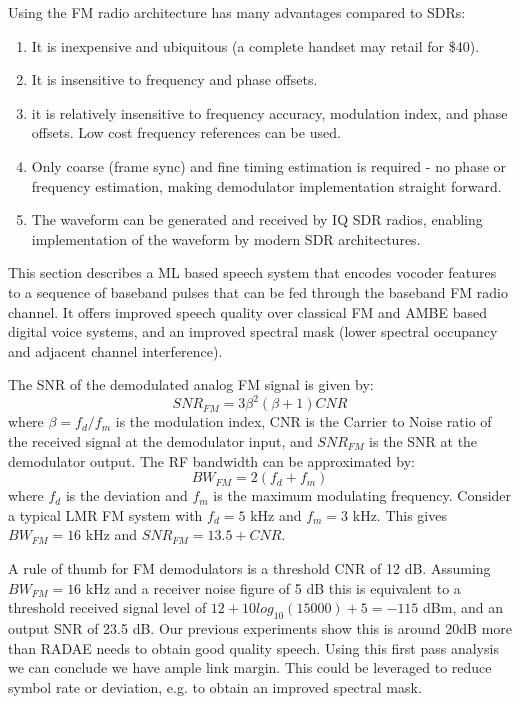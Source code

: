 \documentclass{article}
\begin{document}
Using the FM radio architecture has many advantages compared to SDRs:
\begin{enumerate}
\item It is inexpensive and ubiquitous (a complete handset may retail for \$40).
\item It is insensitive to frequency and phase offsets.
\item it is relatively insensitive to frequency accuracy, modulation index, and phase offsets. Low cost frequency references can be used.
\item Only coarse (frame sync) and fine timing estimation is required - no phase or frequency estimation, making demodulator implementation straight forward.
\item The waveform can be generated and received by IQ SDR radios, enabling implementation of the waveform by modern SDR architectures.
\end{enumerate}

This section describes a ML based speech system that encodes vocoder features to a sequence of baseband pulses that can be fed through the baseband FM radio channel.  It offers improved speech quality over classical FM and AMBE based digital voice systems, and an improved spectral mask (lower spectral occupancy and adjacent channel interference). 

The SNR of the demodulated analog FM signal is given by:
\begin{equation}
SNR_{FM} = 3\beta^2(\beta+1) CNR
\end{equation}
where $\beta=f_d / f_m$ is the modulation index, CNR is the Carrier to Noise ratio of the received signal at the demodulator input, and $SNR_{FM}$ is the SNR at the demodulator output. The RF bandwidth can be approximated by:
\begin{equation}
BW_{FM} = 2(f_d+f_m)
\end{equation}
where $f_d$ is the deviation and $f_m$ is the maximum modulating frequency.  Consider a typical LMR FM system with $f_d=5$ kHz and $f_m=3$ kHz.  This gives $BW_{FM}=16$ kHz and $SNR_{FM}=13.5+CNR$.

A rule of thumb for FM demodulators is a threshold CNR of 12 dB. Assuming $BW_{FM}=16$ kHz and a receiver noise figure of 5 dB this is equivalent to a threshold received signal level of $12 + 10log_{10}(15000) + 5  = -115$ dBm, and an output SNR of 23.5 dB. Our previous experiments show this is around 20dB more than RADAE needs to obtain good quality speech.  Using this first pass analysis we can conclude we have ample link margin.  This could be leveraged to reduce symbol rate or deviation, e.g. to obtain an improved spectral mask.
\end{document}
